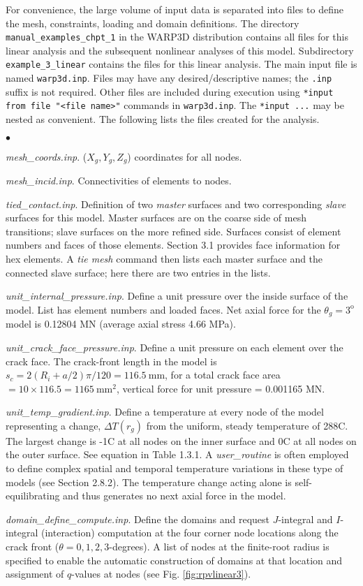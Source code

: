 \documentclass[11pt]{report}
\numberwithin{equation}{section}
\newcommand{\degree } {\mathrm{o} }  %
\newcommand{\ttt} {\texttt}  %
\newcommand{\ti}{\emph}
\newcommand{\squishlist}{
 \begin{list}{$\bullet$}
  { \setlength{\itemsep}{0pt}
     \setlength{\parsep}{3pt}
     \setlength{\topsep}{3pt}
     \setlength{\partopsep}{0pt}
     \setlength{\leftmargin}{1.5em}
     \setlength{\labelwidth}{1em}
     \setlength{\labelsep}{0.5em} } }
\newcommand{\squishend}{
  \end{list}  }
\begin{document}
For convenience, the large volume of input data is separated into files to define the mesh, 
constraints, loading and domain definitions. The directory \ttt{manual\_examples\_chpt\_1} in the WARP3D
distribution contains all files for this linear analysis and the subsequent nonlinear analyses of this
model. Subdirectory \ttt{example\_3\_linear} contains the
files for this linear analysis. The main input file is named \ttt{warp3d.inp}. Files 
may have any desired/descriptive names; the \ttt{.inp} suffix is not required. Other files are 
included during execution using
\ttt{*input from file "<file name>"} commands in \ttt{warp3d.inp}. The \ttt{*input ...} may be nested
as convenient.
The following lists the files created for the analysis.

\squishlist
\item \ti{mesh\_coords.inp}. ($X_g, Y_g, Z_g$) coordinates for all nodes.
\item \ti{mesh\_incid.inp}. Connectivities of elements to nodes.
\item \ti{tied\_contact.inp}. Definition of two \ti{master} surfaces and 
two corresponding \ti{slave} surfaces for this model. Master 
surfaces are on the coarse side of mesh transitions; slave surfaces on the more refined side. Surfaces
consist of element numbers and faces of those elements. Section 3.1 provides face information
for hex elements. A
\ti{tie mesh} command then lists each master surface and the connected slave surface; here there
are two entries in the lists.
\item \ti{unit\_internal\_pressure.inp}. Define a unit pressure over the inside
surface of the model. List has element numbers and loaded faces. Net axial force for the
$\theta_g=3^\degree$ model is 0.12804 MN (average axial stress 4.66 MPa).
\item \ti{unit\_crack\_face\_pressure.inp}. Define a unit pressure on each element over the crack
face. The crack-front length in the model is $s_c= 2 (R_i + a/2) \pi /120 = 116.5\ \mathrm{mm}$,
for a total crack face area $= 10 \times 116.5=1165\ \mathrm{mm}^2$, vertical force for 
unit pressure = 0.001165 MN.
\item \ti{unit\_temp\_gradient.inp}. Define a temperature at every node of the model representing a change,
$\Delta T(r_g)$ from the uniform, steady temperature of 288C. 
The largest change is -1C at all nodes on the inner surface and 
0C at all nodes on the outer surface. See equation in Table 1.3.1. 
A \ti{user\_routine} is often employed to
define complex spatial and temporal temperature variations  in these
type of models (see Section 2.8.2).
The temperature change acting alone is self-equilibrating and thus generates
no next axial force in the model.
\item \ti{domain\_define\_compute.inp}. Define the domains and request
$J$-integral and $I$-integral (interaction)  computation at the four corner
node locations along the crack front ($\theta=0, 1, 2, 3$-degrees). A list of nodes
at the finite-root radius  is specified to enable the automatic construction of domains 
at that location
and assignment of $q$-values at nodes (see Fig. \ref{fig:rpvlinear3}).
\squishend
\end{document}
